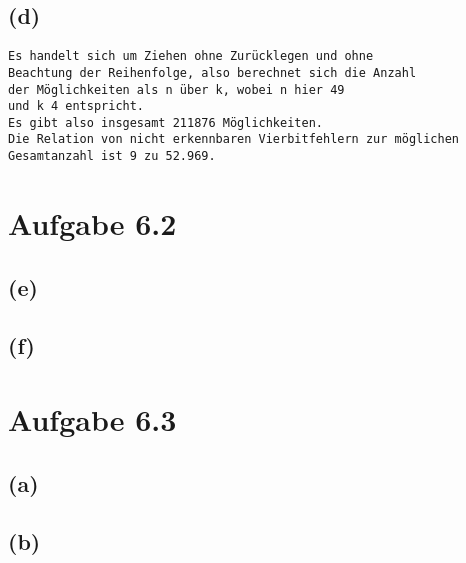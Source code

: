 \documentclass[12pt]{article}
\begin{document}
\subsection{(d)}
\begin{verbatim}
Es handelt sich um Ziehen ohne Zurücklegen und ohne
Beachtung der Reihenfolge, also berechnet sich die Anzahl
der Möglichkeiten als n über k, wobei n hier 49
und k 4 entspricht.
Es gibt also insgesamt 211876 Möglichkeiten.
Die Relation von nicht erkennbaren Vierbitfehlern zur möglichen
Gesamtanzahl ist 9 zu 52.969.
\end{verbatim}

\section{Aufgabe 6.2}
\subsection{(e)}

\subsection{(f)}


\section{Aufgabe 6.3}
\subsection{(a)}

\subsection{(b)}
\end{document}
